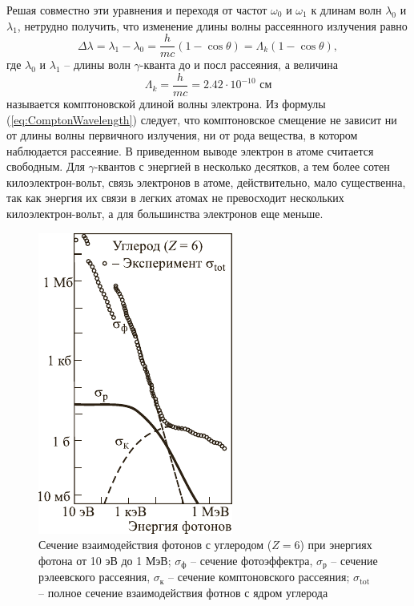 \documentclass[a4paper, 12pt]{article}
\begin{document}
\par
Решая совместно эти уравнения и переходя от частот $\omega_0$ и $\omega_1$ к длинам волн $\lambda_0$ и $\lambda_1$, нетрудно получить, что изменение длины волны рассеянного излучения равно
\begin{equation}
	\Delta\lambda=\lambda_1-\lambda_0=\frac{h}{mc}\left(1-\cos\theta\right)=\Lambda_k\left(1-\cos\theta\right),
	\label{eq:ComptonWavelength}
\end{equation}
где $\lambda_0$ и $\lambda_1$ -- длины волн $\gamma$-кванта до и посл рассеяния, а величина
\begin{equation*}
	\Lambda_k=\frac{h}{mc}=2.42\cdot10^{-10}\text{ см}
\end{equation*}
называется комптоновской длиной волны электрона. Из формулы (\ref{eq:ComptonWavelength}) следует, что комптоновское смещение не зависит ни от длины волны первичного излучения, ни от рода вещества, в котором наблюдается рассеяние. В приведенном выводе электрон в атоме считается свободным. Для $\gamma$-квантов с энергией в несколько десятков, а тем более сотен килоэлектрон-вольт, связь электронов в атоме, действительно, мало существенна, так как энергия их связи в легких атомах не превосходит нескольких килоэлектрон-вольт, а для большинства электронов еще меньше.\par
\begin{figure}
	\begin{center}
		\includegraphics[scale=1.3]{pic2.pdf}
		\caption{Сечение взаимодействия фотонов с углеродом ($Z=6$) при энергиях фотона от 10 эВ до 1 МэВ; $\sigma_{\text{ф}}$ -- сечение фотоэффектра, $\sigma_{\text{р}}$ -- сечение рэлеевского рассеяния, $\sigma_{\text{к}}$ -- сечение комптоновского рассеяния; $\sigma_{\text{tot}}$ -- полное сечение взаимодействия фотнов с ядром углерода}
		\label{pic2}
	\end{center}	
\end{figure}
\end{document}

